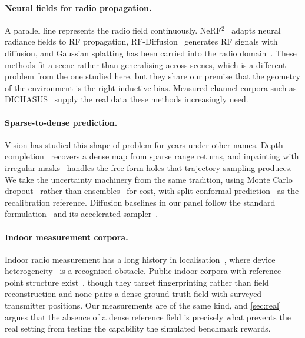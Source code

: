 \paragraph{Neural fields for radio propagation.}
A parallel line represents the radio field continuously.
NeRF$^2$~\cite{zhao2023nerf2} adapts neural radiance fields to RF propagation,
RF-Diffusion~\cite{chi2024rfdiffusion} generates RF signals with diffusion, and
Gaussian splatting has been carried into the radio
domain~\cite{zhang2024rf3dgs, wen2025wrfgs}. These methods fit a scene rather than
generalising across scenes, which is a different problem from the one studied here,
but they share our premise that the geometry of the environment is the right
inductive bias. Measured channel corpora such as DICHASUS~\cite{euchner2021dichasus}
supply the real data these methods increasingly need.

\paragraph{Sparse-to-dense prediction.}
Vision has studied this shape of problem for years under other names. Depth
completion~\cite{ma2018sparsetodense} recovers a dense map from sparse range
returns, and inpainting with irregular masks~\cite{liu2018partialconv} handles the
free-form holes that trajectory sampling produces. We take the uncertainty
machinery from the same tradition, using Monte Carlo
dropout~\cite{gal2016dropout} rather than
ensembles~\cite{lakshminarayanan2017ensembles} for cost, with split conformal
prediction~\cite{lei2018conformal, angelopoulos2023conformal} as the recalibration
reference. Diffusion baselines in our panel follow the standard
formulation~\cite{ho2020ddpm} and its accelerated
sampler~\cite{song2021ddim}.

\paragraph{Indoor measurement corpora.}
Indoor radio measurement has a long history in
localisation~\cite{bahl2000radar, youssef2005horus}, where device
heterogeneity~\cite{kjaergaard2011heterogeneous, zafari2019survey} is a recognised
obstacle. Public indoor corpora with reference-point structure
exist~\cite{bi2022sodindoorloc, klus2024tuji1, moayeri2016perfloc, moayeri2018perfloc2},
though they target fingerprinting rather than field reconstruction and none pairs a
dense ground-truth field with surveyed transmitter positions. Our measurements are
of the same kind, and \cref{sec:real} argues that the absence of a dense reference
field is precisely what prevents the real setting from testing the capability the
simulated benchmark rewards.
